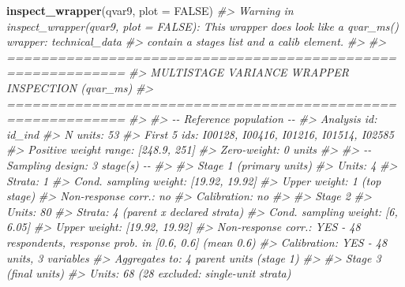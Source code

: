 \documentclass[
]{article}
\newenvironment{Shaded}{\begin{snugshade}}{\end{snugshade}}
\newcommand{\AttributeTok}[1]{\textcolor[rgb]{0.13,0.29,0.53}{#1}}
\newcommand{\CommentTok}[1]{\textcolor[rgb]{0.56,0.35,0.01}{\textit{#1}}}
\newcommand{\ConstantTok}[1]{\textcolor[rgb]{0.56,0.35,0.01}{#1}}
\newcommand{\FunctionTok}[1]{\textcolor[rgb]{0.13,0.29,0.53}{\textbf{#1}}}
\newcommand{\NormalTok}[1]{#1}
\begin{document}
\begin{Shaded}
\begin{Highlighting}[]
\FunctionTok{inspect\_wrapper}\NormalTok{(qvar9, }\AttributeTok{plot =} \ConstantTok{FALSE}\NormalTok{)}
\CommentTok{\#\textgreater{} Warning in inspect\_wrapper(qvar9, plot = FALSE): This wrapper does look like a qvar\_ms() wrapper: technical\_data }
\CommentTok{\#\textgreater{}       contain a \textquotesingle{}stages\textquotesingle{} list and a \textquotesingle{}calib\textquotesingle{} element.}
\CommentTok{\#\textgreater{} }
\CommentTok{\#\textgreater{} ============================================================}
\CommentTok{\#\textgreater{}   MULTISTAGE VARIANCE WRAPPER INSPECTION (qvar\_ms)}
\CommentTok{\#\textgreater{} ============================================================}
\CommentTok{\#\textgreater{} }
\CommentTok{\#\textgreater{} {-}{-} Reference population {-}{-}}
\CommentTok{\#\textgreater{}   Analysis id:     id\_ind }
\CommentTok{\#\textgreater{}   N units:         53 }
\CommentTok{\#\textgreater{}   First 5 ids:     I00128, I00416, I01216, I01514, I02585 }
\CommentTok{\#\textgreater{}   Positive weight range: [248.9, 251]}
\CommentTok{\#\textgreater{}   Zero{-}weight:     0  units}
\CommentTok{\#\textgreater{} }
\CommentTok{\#\textgreater{} {-}{-} Sampling design: 3 stage(s) {-}{-}}
\CommentTok{\#\textgreater{} }
\CommentTok{\#\textgreater{}   Stage 1 (primary units)}
\CommentTok{\#\textgreater{}     Units:                 4}
\CommentTok{\#\textgreater{}     Strata:                1}
\CommentTok{\#\textgreater{}     Cond. sampling weight: [19.92, 19.92]}
\CommentTok{\#\textgreater{}     Upper weight:    1 (top stage)}
\CommentTok{\#\textgreater{}     Non{-}response corr.:     no}
\CommentTok{\#\textgreater{}     Calibration:            no}
\CommentTok{\#\textgreater{} }
\CommentTok{\#\textgreater{}   Stage 2}
\CommentTok{\#\textgreater{}     Units:                 80}
\CommentTok{\#\textgreater{}     Strata:                4  (parent x declared strata)}
\CommentTok{\#\textgreater{}     Cond. sampling weight: [6, 6.05]}
\CommentTok{\#\textgreater{}     Upper weight:    [19.92, 19.92]}
\CommentTok{\#\textgreater{}     Non{-}response corr.:     YES {-} 48 respondents, response prob. in [0.6, 0.6] (mean 0.6)}
\CommentTok{\#\textgreater{}     Calibration:            YES {-} 48 units, 3 variables}
\CommentTok{\#\textgreater{}     Aggregates to:          4 parent units (stage 1)}
\CommentTok{\#\textgreater{} }
\CommentTok{\#\textgreater{}   Stage 3 (final units)}
\CommentTok{\#\textgreater{}     Units:                 68  (28 excluded: single{-}unit strata)}

\end{Highlighting}
\end{Shaded}
\end{document}
